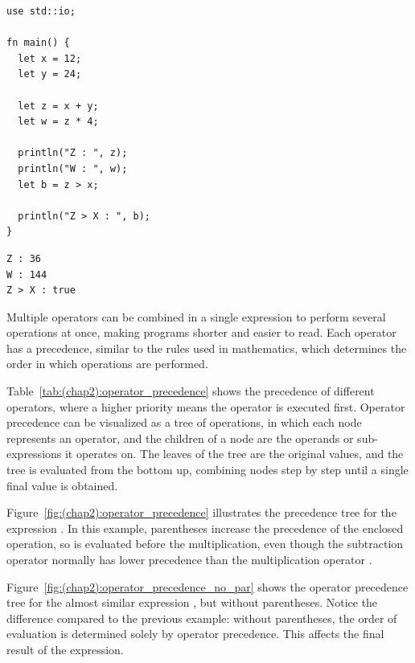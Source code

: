 \begin{lstlisting}[style=coloredverbatim, label=lst:(chap2):operator_example, caption=Example of basic operators on \token{i32} values]
use std::io;

fn main() {
  let x = 12;
  let y = 24;

  let z = x + y;
  let w = z * 4;

  println("Z : ", z);
  println("W : ", w);
  let b = z > x;

  println("Z > X : ", b);
}
\end{lstlisting}
\vspace{-10pt}%
\begin{lstlisting}[style=bashVerb, label=lst:(chap2):operator_example_output]
Z : 36
W : 144
Z > X : true
\end{lstlisting}

Multiple operators can be combined in a single expression to perform several
operations at once, making programs shorter and easier to read. Each operator
has a precedence, similar to the rules used in mathematics, which determines the
order in which operations are performed.


Table~\ref{tab:(chap2):operator_precedence} shows the precedence of
different operators, where a higher priority means the operator is executed
first. Operator precedence can be visualized as a tree of operations, in which
each node represents an operator, and the children of a node are the operands or
sub-expressions it operates on. The leaves of the tree are the original values,
and the tree is evaluated from the bottom up, combining nodes step by step until
a single final value is obtained.


Figure~\ref{fig:(chap2):operator_precedence} illustrates the precedence tree for
the expression . In this example, parentheses \token{()}
increase the precedence of the enclosed operation, so  is evaluated
before the multiplication, even though the subtraction operator \token{-}
normally has lower precedence than the multiplication operator \token{*}.



Figure~\ref{fig:(chap2):operator_precedence_no_par} shows the operator
precedence tree for the almost similar expression , but
without parentheses. Notice the difference compared to the previous example:
without parentheses, the order of evaluation is determined solely by operator
precedence. This affects the final result of the expression.

